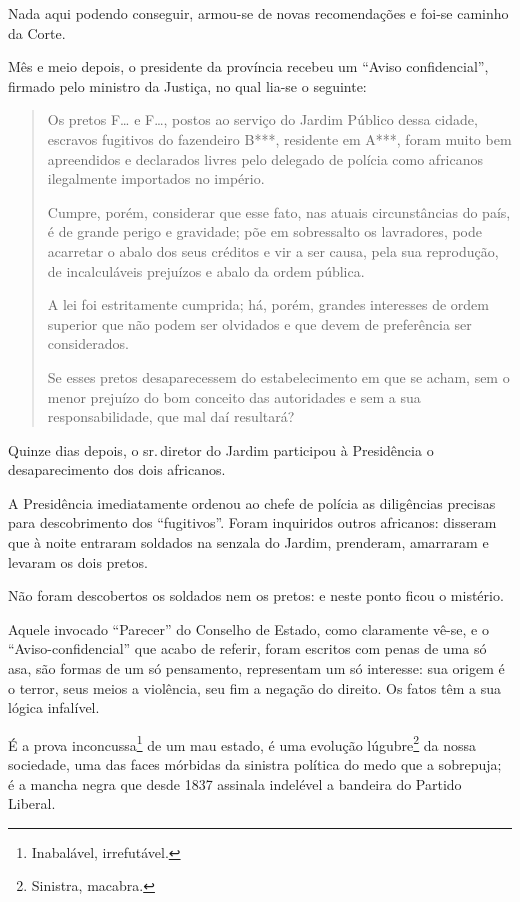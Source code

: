 Nada aqui podendo conseguir, armou-se de novas recomendações e foi-se
caminho da Corte.

Mês e meio depois, o presidente da província recebeu um ``Aviso
confidencial'', firmado pelo ministro da Justiça, no qual lia-se o
seguinte:

\begin{quote}
Os pretos F\ldots{} e F\ldots{}, postos ao serviço do Jardim Público dessa
cidade, escravos fugitivos do fazendeiro B***, residente em A***, foram
muito bem apreendidos e declarados livres pelo delegado de polícia como
africanos ilegalmente importados no império.

Cumpre, porém, considerar que esse fato, nas atuais circunstâncias do
país, é de grande perigo e gravidade; põe em sobressalto os lavradores,
pode acarretar o abalo dos seus créditos e vir a ser causa, pela sua
reprodução, de incalculáveis prejuízos e abalo da ordem pública.

A lei foi estritamente cumprida; há, porém, grandes interesses de ordem
superior que não podem ser olvidados e que devem de preferência ser
considerados.

Se esses pretos desaparecessem do estabelecimento em que se acham, sem o
menor prejuízo do bom conceito das autoridades e sem a sua
responsabilidade, que mal daí resultará?
\end{quote}

\noindent\dotfill{}

Quinze dias depois, o sr.\,diretor do Jardim participou à Presidência o
desaparecimento dos dois africanos.

A Presidência imediatamente ordenou ao chefe de polícia as diligências
precisas para descobrimento dos ``fugitivos''. Foram inquiridos outros
africanos: disseram que à noite entraram soldados na senzala do Jardim,
prenderam, amarraram e levaram os dois pretos.

Não foram descobertos os soldados nem os pretos: e neste ponto ficou o
mistério.

Aquele invocado ``Parecer'' do Conselho de Estado, como claramente vê-se,
e o ``Aviso-confidencial'' que acabo de referir, foram escritos com penas
de uma só asa, são formas de um só pensamento, representam um só
interesse: sua origem é o terror, seus meios a violência, seu fim a
negação do direito. Os fatos têm a sua lógica infalível.

É a prova inconcussa\footnote{Inabalável, irrefutável.} de um mau
estado, é uma evolução lúgubre\footnote{Sinistra, macabra.}
da nossa sociedade, uma das
faces mórbidas da sinistra política do medo que a sobrepuja; é a mancha
negra que desde 1837 assinala indelével a bandeira do Partido Liberal.

